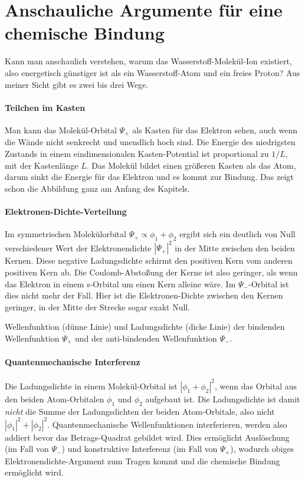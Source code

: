 \section{Anschauliche Argumente für eine chemische Bindung}

Kann man anschaulich verstehen, warum das Wasserstoff-Molekül-Ion existiert, also energetisch günstiger ist als ein Wasserstoff-Atom und ein freies Proton? Aus meiner Sicht gibt es zwei bis drei Wege.

\paragraph{Teilchen im Kasten}  Man kann das Molekül-Orbital $\Psi_+$ als Kasten für das Elektron sehen, auch wenn die Wände nicht senkrecht und unendlich hoch sind. Die Energie des niedrigsten Zustands in einem eindimensionalen  Kasten-Potential ist proportional zu $1/L$, mit der Kastenlänge $L$. Das Molekül bildet einen größeren Kasten als das Atom, darum sinkt die Energie für das Elektron und es kommt zur Bindung. Das zeigt schon die Abbildung ganz am Anfang des Kapitels.


\paragraph{Elektronen-Dichte-Verteilung} Im symmetrischen Molekülorbital $\Psi_+ \propto \phi_1 + \phi_2$ ergibt sich ein deutlich von Null verschiedener Wert der Elektronendichte $|\Psi_+|^2$ in der Mitte zwischen den beiden Kernen. Diese negative Ladungsdichte schirmt den positiven Kern vom anderen positiven Kern ab. Die Coulomb-Abstoßung der Kerne ist also geringer, als wenn das Elektron in einem s-Orbital um einen Kern alleine  wäre. Im $\Psi_-$-Orbital ist dies nicht mehr der Fall. Hier ist die Elektronen-Dichte zwischen den Kernen geringer, in der Mitte der Strecke sogar exakt Null.
%
\begin{marginfigure}[-50mm]
\caption{ Wellenfunktion (dünne Linie) und Ladungsdichte (dicke Linie) der bindenden Wellenfunktion $\Psi_+$ und der  anti-bindenden Wellenfunktion $\Psi_-$.}
\end{marginfigure}




\paragraph{Quantenmechanische Interferenz} Die Ladungsdichte in einem Molekül-Orbital ist $| \phi_1 + \phi_2 |^2$, wenn das Orbital aus den beiden Atom-Orbitalen $\phi_1$ und $\phi_2$ aufgebaut ist. Die Ladungsdichte ist damit \emph{nicht} die Summe der Ladungsdichten der beiden Atom-Orbitale, also nicht $| \phi_1 |^2 +| \phi_2 |^2$. Quantenmechanische Wellenfunktionen interferieren, werden also addiert bevor das Betrags-Quadrat gebildet wird. Dies ermöglicht Auslöschung (im Fall von $\Psi_-$) und konstruktive Interferenz (im Fall von $\Psi_+$), wodurch obiges Elektronendichte-Argument zum Tragen kommt und  die chemische Bindung ermöglicht wird.








